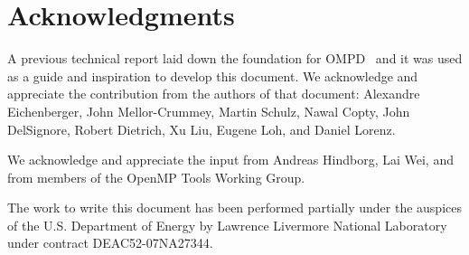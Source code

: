 \section*{Acknowledgments}
%

A previous technical report laid down the foundation for 
OMPD~\cite{ompt-ompd:tr} and it was used as a guide and inspiration to develop 
this document. We acknowledge and appreciate the contribution from the authors 
of that document: 
Alexandre Eichenberger, John Mellor-Crummey, Martin Schulz, Nawal Copty,  John 
DelSignore, Robert Dietrich, Xu Liu, Eugene Loh, and Daniel Lorenz.

We acknowledge and appreciate the input from Andreas Hindborg, Lai Wei, and 
from members of the OpenMP Tools Working Group.

The work to write this document has been performed partially under 
the auspices of the U.S. Department of Energy by Lawrence Livermore National 
Laboratory under contract DEAC52-07NA27344.